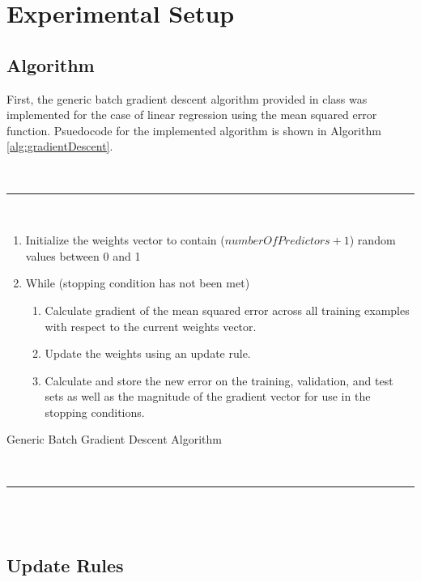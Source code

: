 \documentclass[runningheads]{llncs}
\begin{document}
\section{Experimental Setup}
\label{sec:setup}

\subsection{Algorithm}

First, the generic batch gradient descent algorithm provided in class was implemented for the case of linear regression using the mean squared error function. Psuedocode for the implemented algorithm is shown in Algorithm \ref{alg:gradientDescent}.

\begin{algorithm}[H]
	\hspace{1 mm} \\\hrule\hspace{1 mm} \\
	\begin{enumerate}
		\item Initialize the weights vector to contain (\(numberOfPredictors + 1\)) random values between 0 and 1
		\item While (stopping condition has not been met)
		\begin{enumerate}
			\item Calculate gradient of the mean squared error across all training examples with respect to the current weights vector.
			\item Update the weights using an update rule.
			\item Calculate and store the new error on the training, validation, and test sets as well as the magnitude of the gradient vector for use in the stopping conditions.
		\end{enumerate}
	\end{enumerate}
	\caption{Generic Batch Gradient Descent Algorithm}
	\hspace{1 mm} \\\hrule\hspace{1 mm} \\\hspace{1 mm} \\
	\label{alg:gradientDescent}
\end{algorithm}%

\subsection{Update Rules}
\end{document}
